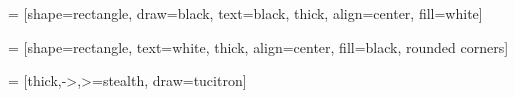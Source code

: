 



 = [shape=rectangle, draw=black, text=black, thick, 	
	align=center, fill=white]

 = [shape=rectangle, text=white, thick, align=center, 
	fill=black, rounded corners]



 = [thick,->,>=stealth, draw=tucitron]
